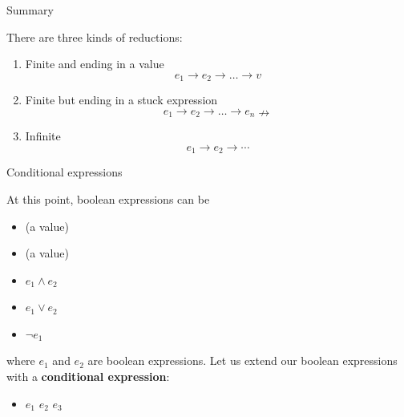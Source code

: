 %
\begin{frame}{Summary}

  There are three kinds of reductions:
  \begin{enumerate}

    \item Finite and ending in a value
  \[e_1 \rightarrow e_2 \rightarrow \dots \rightarrow v\]

    \item Finite but ending in a stuck expression
  \[e_1 \rightarrow e_2 \rightarrow \dots \rightarrow e_n
    \nrightarrow\]

    \item Infinite
  \[e_1 \rightarrow e_2 \rightarrow \cdots\]

  \end{enumerate}

\end{frame}

%
\begin{frame}{Conditional expressions}

  At this point, boolean expressions can be
  \begin{itemize}

    \item \Xtrue (a value)

    \item \Xfalse (a value)

    \item \(e_1 \wedge e_2\)

    \item \(e_1 \vee e_2\)

    \item \(\neg e_1\)

  \end{itemize}
  where \(e_1\) and \(e_2\) are boolean expressions. Let us extend our
  boolean expressions with a \textbf{conditional expression}:
  \begin{itemize}

     \item \Xif \(e_1\) \Xthen \(e_2\) \Xelse \(e_3\)

  \end{itemize}

\end{frame}

